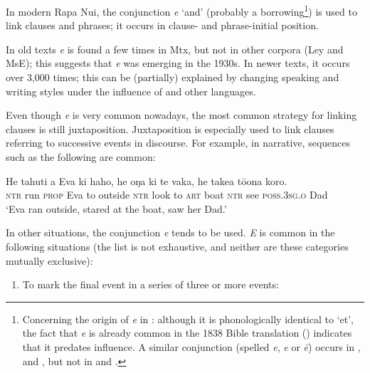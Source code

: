 In modern Rapa Nui, the conjunction \textit{{\ꞌ}e} ‘and’ (probably a  borrowing\footnote{\label{fn:504}Concerning the origin of \textit{{\ꞌ}e} in : although it is phonologically identical to  ‘et’, the fact that \textit{{\ꞌ}e} is already common in the 1838  Bible translation (\citealt{TeBibilia1996}) indicates that it predates  influence. A similar conjunction (spelled \textit{e}, \textit{{\ꞌ}e} or \textit{ē}) occurs in ,  and , but not in  and .}) is used to link clauses and phrases; it occurs in clause- and phrase-initial position.

In old texts \textit{{\ꞌ}e} is found a few times in Mtx, but not in other corpora (Ley and MsE); this suggests that \textit{{\ꞌ}e} was emerging in the 1930s. In newer texts, it occurs over 3,000 times; this can be (partially) explained by changing speaking and writing styles under the influence of  and other languages.

Even though \textit{{\ꞌ}e} is very common nowadays, the most common strategy for linking clauses is still juxtaposition. Juxtaposition is especially used to link clauses referring to successive events in discourse. For example, in narrative, sequences such as the following are common:

\ea\label{ex:11.5}
\gll He tahuti a Eva ki haho, he oŋa ki te vaka, he take{\ꞌ}a tō{\ꞌ}ona koro.\\
\textsc{ntr} run \textsc{prop} Eva to outside \textsc{ntr} look to \textsc{art} boat \textsc{ntr} see \textsc{poss.3sg.o} Dad\\

\glt
‘Eva ran outside, stared at the boat, saw her Dad.’ \textstyleExampleref{[R210.095]} 
\z

In other situations, the conjunction \textit{{\ꞌ}e} tends to be used. \textit{{\ꞌ}E} is common in the following situations (the list is not exhaustive, and neither are these categories mutually exclusive):

\begin{enumerate}
\item 
To mark the final event in a series of three or more events:
\end{enumerate}

